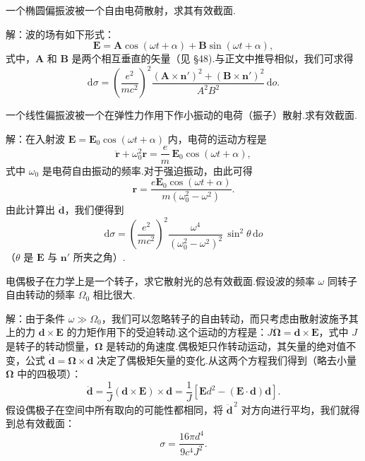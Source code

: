 \begin{xiti}

\quad 一个椭圆偏振波被一个自由电荷散射，求其有效截面.

解：波的场有如下形式：
\begin{equation*}
  \boldsymbol{E}=\boldsymbol{A}\cos(\omega t+\alpha)+\boldsymbol{B}\sin(\omega t+\alpha),
\end{equation*}
式中，$\boldsymbol{A}$ 和 $\boldsymbol{B}$ 是两个相互垂直的矢量（见 §48).与正文中推导相似，我们可求得
\begin{equation*}
  \mathrm{d}\sigma=\left(\frac{e^2}{mc^2}\right)^{\!2}
  \frac{(\boldsymbol{A}\times\boldsymbol{n}')^2+(\boldsymbol{B}\times\boldsymbol{n}')^2}{A^2B^2}\,\mathrm{d}o.
\end{equation*}

\quad 一个线性偏振波被一个在弹性力作用下作小振动的电荷（振子）散射.求有效截面.

解：在入射波 $\boldsymbol{E}=\boldsymbol{E}_0\cos(\omega t+\alpha)$ 内，电荷的运动方程是
\begin{equation*}
  \ddot{\boldsymbol{r}}+\omega_0^2\boldsymbol{r}
  =\frac{e}{m}\,\boldsymbol{E}_0\cos(\omega t+\alpha),
\end{equation*}
式中 $\omega_0$ 是电荷自由振动的频率.对于强迫振动，由此可得
\begin{equation*}
  \boldsymbol{r}=\frac{e\boldsymbol{E}_0\cos(\omega t+\alpha)}{m(\omega_0^2-\omega^2)}.
\end{equation*}
由此计算出 $\ddot{\boldsymbol{d}}$，我们便得到
\begin{equation*}
  \mathrm{d}\sigma=\left(\frac{e^2}{mc^2}\right)^{\!2}
  \frac{\omega^4}{(\omega_0^2-\omega^2)^2}\,\sin^2\theta\,\mathrm{d}o
\end{equation*}
（$\theta$ 是 $\boldsymbol{E}$ 与 $\boldsymbol{n}'$ 所夹之角）.

\quad 电偶极子在力学上是一个转子，求它散射光的总有效截面.假设波的频率 $\omega$ 同转子自由转动的频率 $\Omega_0$ 相比很大.

解：由于条件 $\omega\gg\Omega_0$，我们可以忽略转子的自由转动，而只考虑由散射波施予其上的力 $\boldsymbol{d}\times\boldsymbol{E}$ 的力矩作用下的受迫转动.这个运动的方程是：$J\dot{\boldsymbol{\Omega}}=\boldsymbol{d}\times\boldsymbol{E}$，式中 $J$ 是转子的转动惯量，$\boldsymbol{\Omega}$ 是转动的角速度.偶极矩只作转动运动，其矢量的绝对值不变，公式 $\dot{\boldsymbol{d}}=\boldsymbol{\Omega}\times\boldsymbol{d}$ 决定了偶极矩矢量的变化.从这两个方程我们得到（略去小量 $\boldsymbol{\Omega}$ 中的四极项）：
\begin{equation*}
  \ddot{\boldsymbol{d}}=\frac{1}{J}(\boldsymbol{d}\times\boldsymbol{E})\times\boldsymbol{d}
  =\frac{1}{J}\left[\boldsymbol{E}d^2-(\boldsymbol{E}\cdot\boldsymbol{d})\boldsymbol{d}\right].
\end{equation*}
假设偶极子在空间中所有取向的可能性都相同，将 $\ddot{\boldsymbol{d}}^{\,2}$ 对方向进行平均，我们就得到总有效截面：
\begin{equation*}
  \sigma=\frac{16\pi d^4}{9c^4J^2}.
\end{equation*}


\end{xiti}
